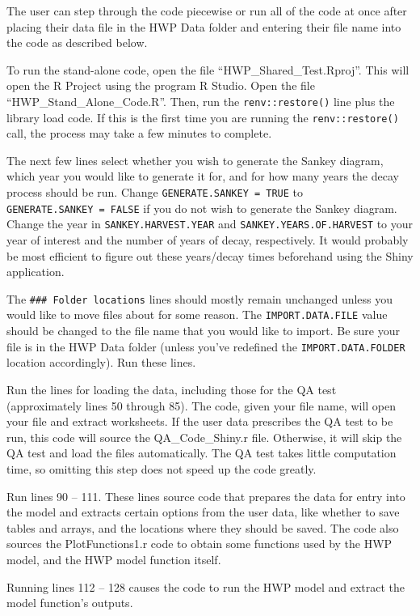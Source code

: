 \documentclass[
]{book}
\begin{document}
The user can step through the code piecewise or run all of the code at once after placing their data file in the HWP Data folder and entering their file name into the code as described below.

To run the stand-alone code, open the file ``HWP\_Shared\_Test.Rproj''. This will open the R Project using the program R Studio. Open the file ``HWP\_Stand\_Alone\_Code.R''. Then, run the \texttt{renv::restore()} line plus the library load code. If this is the first time you are running the \texttt{renv::restore()} call, the process may take a few minutes to complete.

The next few lines select whether you wish to generate the Sankey diagram, which year you would like to generate it for, and for how many years the decay process should be run. Change \texttt{GENERATE.SANKEY\ =\ TRUE} to \texttt{GENERATE.SANKEY\ =\ FALSE} if you do not wish to generate the Sankey diagram. Change the year in \texttt{SANKEY.HARVEST.YEAR} and \texttt{SANKEY.YEARS.OF.HARVEST} to your year of interest and the number of years of decay, respectively. It would probably be most efficient to figure out these years/decay times beforehand using the Shiny application.

The \texttt{\#\#\#\ Folder\ locations} lines should mostly remain unchanged unless you would like to move files about for some reason. The \texttt{IMPORT.DATA.FILE} value should be changed to the file name that you would like to import. Be sure your file is in the HWP Data folder (unless you've redefined the \texttt{IMPORT.DATA.FOLDER} location accordingly). Run these lines.

Run the lines for loading the data, including those for the QA test (approximately lines 50 through 85). The code, given your file name, will open your file and extract worksheets. If the user data prescribes the QA test to be run, this code will source the QA\_Code\_Shiny.r file. Otherwise, it will skip the QA test and load the files automatically. The QA test takes little computation time, so omitting this step does not speed up the code greatly.

Run lines 90 -- 111. These lines source code that prepares the data for entry into the model and extracts certain options from the user data, like whether to save tables and arrays, and the locations where they should be saved. The code also sources the PlotFunctions1.r code to obtain some functions used by the HWP model, and the HWP model function itself.

Running lines 112 -- 128 causes the code to run the HWP model and extract the model function's outputs.
\end{document}
